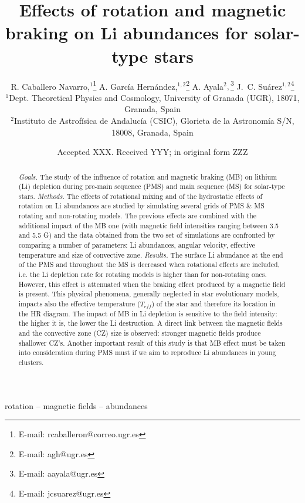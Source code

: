 \documentclass[fleqn,usenatbib]{mnras}
\title[Rotation, magnetic braking \& Li abundances]{Effects of rotation and magnetic braking on Li abundances for solar-type stars}
\author[R. Caballero Navarro et al.]{
R. Caballero Navarro,$^{1}$\thanks{E-mail: rcaballeron@correo.ugr.es}
A. Garc\'ia Hern\'andez,$^{1,2}$\thanks{E-mail: agh@ugr.es}
A. Ayala$^{2},$\thanks{E-mail: aayala@ugr.es}
J.~C. Su\'arez$^{1,2}$\thanks{E-mail: jcsuarez@ugr.es}
\\
$^{1}$Dept. Theoretical Physics and Cosmology, University of Granada (UGR), 18071, Granada, Spain\\
$^{2}$Instituto de Astrof\'isica de Andaluc\'ia (CSIC), Glorieta de la Astronom\'ia S/N, 18008, Granada, Spain\\
}
\date{Accepted XXX. Received YYY; in original form ZZZ}
\begin{document}
\label{firstpage}
\pagerange{\pageref{firstpage}--\pageref{lastpage}}
\maketitle

\begin{abstract}
\textit{Goals.} The study of the influence of rotation and magnetic braking (MB) on lithium (Li) depletion during pre-main sequence (PMS) and main sequence (MS) for solar-type stars.
\newline\textit{Methods.} The effects of rotational mixing and of the hydrostatic effects of rotation on Li abundances are studied by simulating several grids of PMS \& MS rotating and non-rotating models. The previous effects are combined with the additional impact of the MB one (with magnetic field intensities ranging between 3.5 and 5.5 G) and the data obtained from the two set of simulations are confronted by comparing a number of parameters: Li abundances, angular velocity, effective temperature and size of convective zone.
\newline\textit{Results.} The surface Li abundance at the end of the PMS and throughout the MS is decreased when rotational effects are included, i.e. the Li depletion rate for rotating models is higher than for non-rotating ones. However, this effect is attenuated when the braking effect produced by a magnetic field is present. This physical phenomena, generally neglected in star evolutionary models, impacts also the effective temperature ($T_{eff}$) of the star and therefore its location in the HR diagram. The impact of MB in Li depletion is sensitive to the field intensity: the higher it is, the lower the Li destruction. A direct link between the magnetic fields and the convective zone (CZ) size is observed: stronger magnetic fields produce shallower CZ's. Another important result of this study is that MB effect must be taken into consideration during PMS must if we aim to reproduce Li abundances in young clusters.
\end{abstract}

\begin{keywords}
rotation -- magnetic fields -- abundances
\end{keywords}


\end{document}
